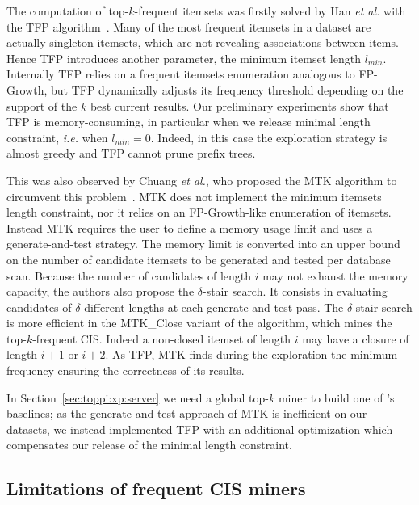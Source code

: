 The computation of top-$k$-frequent itemsets was firstly solved by Han {\em et al.}
with the TFP algorithm~\cite{HanICDM02,WangTKDE05}.
Many of the most frequent itemsets in a dataset are actually singleton itemsets,
which are not revealing associations between items.
Hence TFP introduces another parameter, the minimum itemset length $l_{min}$.
Internally TFP relies on a frequent itemsets enumeration analogous to FP-Growth,
but TFP dynamically adjusts its frequency threshold depending on the support of the $k$ best current results.
Our preliminary experiments show that TFP is memory-consuming,
in particular when we release minimal length constraint, {\em i.e.} when $l_{min} = 0$.
Indeed, in this case the exploration strategy is almost greedy and TFP cannot prune prefix trees.

This was also observed by Chuang {\em et al.},
who proposed the MTK algorithm to circumvent this problem~\cite{ChuangVLDBJ07}.
MTK does not implement the minimum itemsets length constraint,
nor it relies on an FP-Growth-like enumeration of itemsets.
Instead MTK requires the user to define a memory usage limit
and uses a generate-and-test strategy.
The memory limit is converted into an upper bound on the number of candidate itemsets
to be generated and tested per database scan.
Because the number of candidates of length $i$ may not exhaust the memory capacity,
the authors also propose the $\delta$-stair search.
It consists in evaluating candidates of $\delta$ different lengths at each generate-and-test pass.
The $\delta$-stair search is more efficient in the MTK\_Close variant of the algorithm,
which mines the top-$k$-frequent CIS.
Indeed a non-closed itemset of length $i$ may have a closure of length $i+1$ or $i+2$.
As TFP, MTK finds during the exploration the minimum frequency ensuring the correctness of its results.

In Section~\ref{sec:toppi:xp:server} we need a global top-$k$ miner to build one of \toppi's baselines;
as the generate-and-test approach of MTK is inefficient on our datasets,
we instead implemented TFP with an additional optimization which compensates
our release of the minimal length constraint.



\subsection{Limitations of frequent CIS miners}

